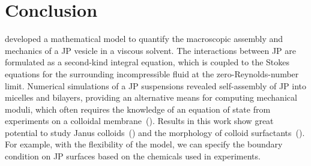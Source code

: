 \documentclass[lineno]{jfm}
\begin{document}
\section{\label{conclusion}Conclusion}

\cite{Fu20} developed a mathematical model to quantify the macroscopic
assembly and mechanics of a JP vesicle in a viscous solvent. The
interactions between JP are formulated as a second-kind integral
equation, which is coupled to the Stokes equations for the surrounding
incompressible fluid at the zero-Reynolds-number limit. Numerical
simulations of a JP suspensions revealed self-assembly of JP into
micelles and bilayers, providing an alternative means for computing
mechanical moduli, which often requires the knowledge of an equation of
state from experiments on a colloidal
membrane~(\cite{Balchunas2019_SM}).
%
%
Results in this work show great potential to study Janus colloids~(\cite{Bradley2017,Mallory2017}) and the morphology of colloid
surfactants~(\cite{Bradley2016}). 
%
For example, with the flexibility of the model, we can specify the
boundary condition on JP surfaces based on the chemicals used in
experiments.

\end{document}
